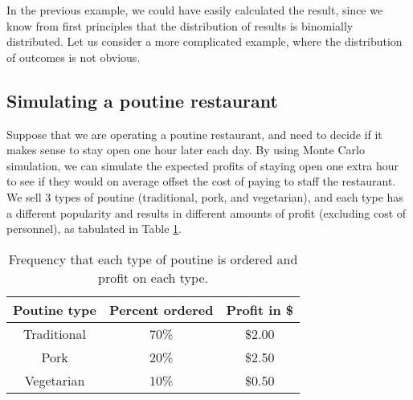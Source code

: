 
In the previous example, we could have easily calculated the result, since we know from first principles that the distribution of results is binomially distributed. Let us consider a more complicated example, where the distribution of outcomes is not obvious.

\subsection{Simulating a poutine restaurant}
Suppose that we are operating a poutine restaurant, and need to decide if it makes sense to stay open one hour later each day. By using Monte Carlo simulation, we can simulate the expected profits of staying open one extra hour to see if they would on average offset the cost of paying to staff the restaurant. We sell 3 types of poutine (traditional, pork, and vegetarian), and each type has a different popularity and results in different amounts of profit (excluding cost of personnel), as tabulated in Table \ref{tab:poutineProfits}.
\begin{table}[h!]
\center
\begin{tabular}{|c|c|c|}
\hline
\textbf{Poutine type} & \textbf{Percent ordered} & \textbf{Profit in \$}\\
\hline
Traditional & 70\% & \$2.00\\
Pork & 20\% & \$2.50\\
Vegetarian & 10\% & \$0.50\\
\hline
\end{tabular}
\caption{\label{tab:poutineProfits} Frequency that each type of poutine is ordered and profit on each type.}
\end{table}

